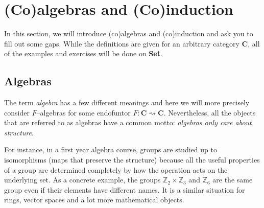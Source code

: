 \documentclass{article}
\theoremstyle{definition}
\theoremstyle{remark}
\newcommand{\Z}{\mathbb{Z}}
\begin{document}
\section{(Co)algebras and (Co)induction}

In this section, we will introduce (co)algebras and (co)induction and ask you to fill out some gaps. While the definitions are given for an arbitrary category $\mathbf{C}$, all of the examples and exercises will be done on \textbf{Set}.

\subsection{Algebras}
The term \textit{algebra} has a few different meanings and here we will more precisely consider $F$--algebras for some endofuntor $F:\mathbf{C}\rightsquigarrow \mathbf{C}$. Nevertheless, all the objects that are referred to as algebras have a common motto: \textit{algebras only care about structure}.

For instance, in a first year algebra course, groups are studied up to isomorphisms (maps that preserve the structure) because all the useful properties of a group are determined completely by how the operation acts on the underlying set. As a concrete example, the groups $\Z_2 \times \Z_3$ and $\Z_6$ are the same group even if their elements have different names. It is a similar situation for rings, vector spaces and a lot more mathematical objects.
\end{document}
